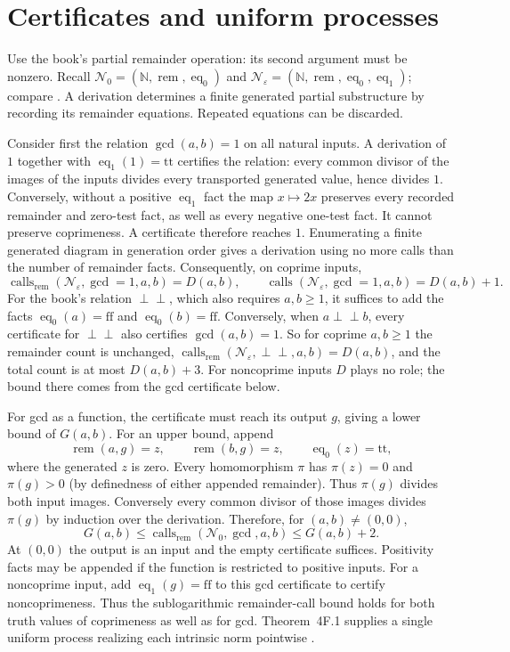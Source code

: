 \documentclass[11pt]{article}
\newcommand{\rem}{\operatorname{rem}}
\newcommand{\calls}{\operatorname{calls}}
\newcommand{\eq}{\operatorname{eq}}
\begin{document}
\section{Certificates and uniform processes}\label{sec:certificates}
Use the book's partial remainder operation: its second argument must be
nonzero. Recall $\mathcal N_0=(\mathbb N,\rem,\eq_0)$ and
$\mathcal N_\varepsilon=(\mathbb N,\rem,\eq_0,\eq_1)$; compare
\cite[(1C-10), pp.~24, 142--143]{moschovakis2019}.
A derivation determines a finite generated partial substructure by recording
its remainder equations. Repeated equations can be discarded.

Consider first the relation $\gcd(a,b)=1$ on all natural inputs. A derivation of $1$
together with $\eq_1(1)=\mathrm{tt}$ certifies the relation: every common
divisor of the images of the inputs divides every transported generated
value, hence divides $1$. Conversely, without a positive $\eq_1$ fact the
map $x\mapsto2x$ preserves every recorded remainder and zero-test fact, as
well as every negative one-test fact. It cannot preserve coprimeness. A
certificate therefore reaches $1$. Enumerating a finite generated diagram
in generation order gives a derivation using no more calls than the number
of remainder facts. Consequently, on coprime inputs,
\[
\calls_{\rem}(\mathcal N_\varepsilon,\gcd{=}1,a,b)=D(a,b),\qquad
\calls(\mathcal N_\varepsilon,\gcd{=}1,a,b)=D(a,b)+1.
\]
For the book's relation $\perp\!\!\!\perp$, which also requires $a,b\geq1$, it
suffices to add the facts $\eq_0(a)=\mathrm{ff}$ and $\eq_0(b)=\mathrm{ff}$.
Conversely, when $a\perp\!\!\!\perp b$, every certificate for
$\perp\!\!\!\perp$ also certifies $\gcd(a,b)=1$. So for coprime $a,b\geq1$ the
remainder count is unchanged,
$\calls_{\rem}(\mathcal N_\varepsilon,\perp\!\!\!\perp,a,b)=D(a,b)$, and the
total count is at most $D(a,b)+3$. For noncoprime inputs $D$ plays no role;
the bound there comes from the gcd certificate below.

For gcd as a function, the certificate must reach its output $g$, giving a
lower bound of $G(a,b)$. For an upper bound, append
\[
\rem(a,g)=z,\qquad \rem(b,g)=z,\qquad \eq_0(z)=\mathrm{tt},
\]
where the generated $z$ is zero. Every homomorphism $\pi$ has $\pi(z)=0$ and
$\pi(g)>0$ (by definedness of either appended remainder). Thus $\pi(g)$
divides both input images. Conversely every common divisor of those images
divides $\pi(g)$ by induction over the derivation. Therefore, for
$(a,b)\neq(0,0)$,
\[
G(a,b)\leq\calls_{\rem}(\mathcal N_0,\gcd,a,b)\leq G(a,b)+2.
\]
At $(0,0)$ the output is an input and the empty certificate suffices.
Positivity facts may be appended if the function is restricted to positive
inputs. For a noncoprime input, add $\eq_1(g)=\mathrm{ff}$ to this gcd
certificate to certify noncoprimeness. Thus the sublogarithmic remainder-call
bound holds for both truth values of coprimeness as well as for gcd.
Theorem~4F.1 supplies a single uniform process realizing each intrinsic norm
pointwise \cite[Theorem~4F.1]{moschovakis2019}.
\end{document}

